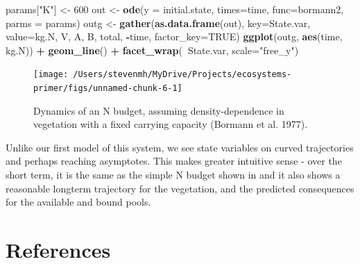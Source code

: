 \documentclass[
]{book}
\newenvironment{Shaded}{\begin{snugshade}}{\end{snugshade}}
\newcommand{\DataTypeTok}[1]{\textcolor[rgb]{0.13,0.29,0.53}{#1}}
\newcommand{\DecValTok}[1]{\textcolor[rgb]{0.00,0.00,0.81}{#1}}
\newcommand{\KeywordTok}[1]{\textcolor[rgb]{0.13,0.29,0.53}{\textbf{#1}}}
\newcommand{\NormalTok}[1]{#1}
\newcommand{\OperatorTok}[1]{\textcolor[rgb]{0.81,0.36,0.00}{\textbf{#1}}}
\newcommand{\OtherTok}[1]{\textcolor[rgb]{0.56,0.35,0.01}{#1}}
\newcommand{\StringTok}[1]{\textcolor[rgb]{0.31,0.60,0.02}{#1}}
\begin{document}
\begin{Shaded}
\begin{Highlighting}[]
\NormalTok{params[}\StringTok{"K"}\NormalTok{] <-}\StringTok{ }\DecValTok{600}
\NormalTok{out <-}\StringTok{ }\KeywordTok{ode}\NormalTok{(}\DataTypeTok{y =}\NormalTok{ initial.state, }\DataTypeTok{times=}\NormalTok{time, }\DataTypeTok{func=}\NormalTok{bormann2, }\DataTypeTok{parms =}\NormalTok{ params)}
\NormalTok{outg <-}\StringTok{ }\KeywordTok{gather}\NormalTok{(}\KeywordTok{as.data.frame}\NormalTok{(out), }\DataTypeTok{key=}\NormalTok{State.var, }\DataTypeTok{value=}\NormalTok{kg.N, }
\NormalTok{              V, A, B, total, }\OperatorTok{-}\NormalTok{time,}
              \DataTypeTok{factor_key=}\OtherTok{TRUE}\NormalTok{)}
\KeywordTok{ggplot}\NormalTok{(outg, }\KeywordTok{aes}\NormalTok{(time, kg.N)) }\OperatorTok{+}\StringTok{ }\KeywordTok{geom_line}\NormalTok{() }\OperatorTok{+}\StringTok{ }\KeywordTok{facet_wrap}\NormalTok{(}\OperatorTok{~}\NormalTok{State.var, }\DataTypeTok{scale=}\StringTok{"free_y"}\NormalTok{)}
\end{Highlighting}
\end{Shaded}

\begin{figure}
\texttt{[image: /Users/stevenmh/MyDrive/Projects/ecosystems-primer/figs/unnamed-chunk-6-1]} \caption{Dynamics of an N budget, assuming density-dependence in vegetation with a fixed carrying capacity (Bormann et al. 1977).}\label{fig:unnamed-chunk-6}
\end{figure}

Unlike our first model of this system, we see state variables on curved trajectories and perhaps reaching asymptotes. This makes greater intuitive sense - over the short term, it is the same as the simple N budget shown in \citet{Bormann1977} and it also shows a reasonable longterm trajectory for the vegetation, and the predicted consequences for the available and bound pools.

\hypertarget{references}{%
\chapter{References}\label{references}}

  
\end{document}

